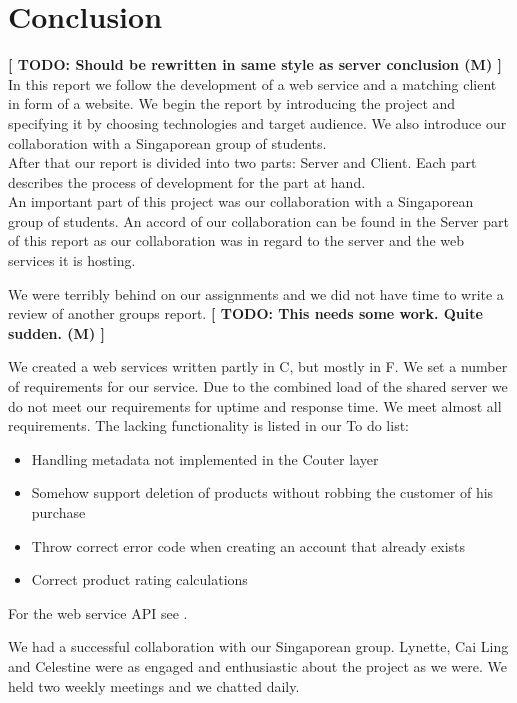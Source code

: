 \section{Conclusion}
\textbf{[ TODO: Should be rewritten in same style as server conclusion (M) ]}
In this report we follow the development of a web service and a matching client in form of a website. We begin the report by introducing the project and specifying it by choosing technologies and target audience. We also introduce our collaboration with a Singaporean group of students.
\\After that our report is divided into two parts: Server and Client. Each part describes the process of development for the part at hand.
\\An important part of this project was our collaboration with a Singaporean group of students. An accord of our collaboration can be found in the Server part of this report as our collaboration was in regard to the server and the web services it is hosting.

We were terribly behind on our assignments and we did not have time to write a review of another groups report. \textbf{[ TODO: This needs some work. Quite sudden. (M) ]}

We created a web services written partly in C\Sh, but mostly in F\Sh. We set a number of requirements for our service. Due to the combined load of the shared server we do not meet our requirements for uptime and response time. We meet almost all requirements. The lacking functionality is listed in our To do list:
\begin{itemize}
\item Handling metadata not implemented in the C\Sh outer layer
\item Somehow support deletion of products without robbing the customer of his purchase
\item Throw correct error code when creating an account that already exists
\item Correct product rating calculations
\end{itemize}
\mbox{}For the web service API see .

We had a successful collaboration with our Singaporean group. Lynette, Cai Ling and Celestine were as engaged and enthusiastic about the project as we were. We held two weekly meetings and we chatted daily.

